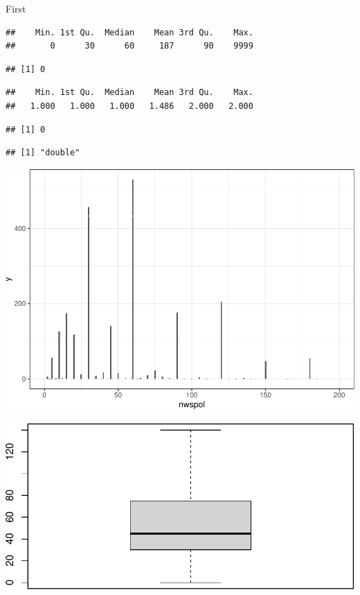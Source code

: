 \documentclass[
]{article}
\begin{document}
First

\begin{verbatim}
##    Min. 1st Qu.  Median    Mean 3rd Qu.    Max. 
##       0      30      60     187      90    9999
\end{verbatim}

\begin{verbatim}
## [1] 0
\end{verbatim}

\begin{verbatim}
##    Min. 1st Qu.  Median    Mean 3rd Qu.    Max. 
##   1.000   1.000   1.000   1.486   2.000   2.000
\end{verbatim}

\begin{verbatim}
## [1] 0
\end{verbatim}

\begin{verbatim}
## [1] "double"
\end{verbatim}

\includegraphics{ESS_DE_files/figure-latex/unnamed-chunk-4-1.pdf}

\includegraphics{ESS_DE_files/figure-latex/unnamed-chunk-5-1.pdf}
\end{document}
